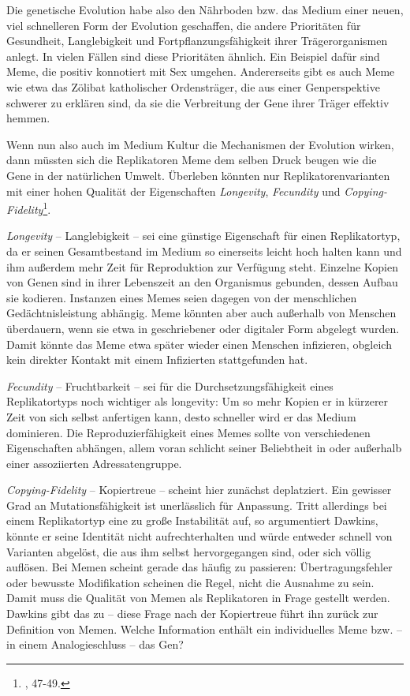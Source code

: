 \documentclass[openany,twoside,twocolumn]{book}
\let\rmarkdownfootnote\footnote%
\def\footnote{\protect\rmarkdownfootnote}
\begin{document}
Die genetische Evolution habe also den Nährboden bzw. das Medium einer neuen, viel schnelleren Form der Evolution geschaffen, die andere Prioritäten für Gesundheit, Langlebigkeit und Fortpflanzungsfähigkeit ihrer Trägerorganismen anlegt. In vielen Fällen sind diese Prioritäten ähnlich. Ein Beispiel dafür sind Meme, die positiv konnotiert mit Sex umgehen. Andererseits gibt es auch Meme wie etwa das Zölibat katholischer Ordensträger, die aus einer Genperspektive schwerer zu erklären sind, da sie die Verbreitung der Gene ihrer Träger effektiv hemmen.

Wenn nun also auch im Medium Kultur die Mechanismen der Evolution wirken, dann müssten sich die Replikatoren Meme dem selben Druck beugen wie die Gene in der natürlichen Umwelt. Überleben könnten nur Replikatorenvarianten mit einer hohen Qualität der Eigenschaften \emph{Longevity}, \emph{Fecundity} und \emph{Copying-Fidelity}\footnote{\textcite{Dawkinsselfishgene40th2016}, 47-49.}.

\emph{Longevity} -- Langlebigkeit -- sei eine günstige Eigenschaft für einen Replikatortyp, da er seinen Gesamtbestand im Medium so einerseits leicht hoch halten kann und ihm außerdem mehr Zeit für Reproduktion zur Verfügung steht. Einzelne Kopien von Genen sind in ihrer Lebenszeit an den Organismus gebunden, dessen Aufbau sie kodieren. Instanzen eines Memes seien dagegen von der menschlichen Gedächtnisleistung abhängig. Meme könnten aber auch außerhalb von Menschen überdauern, wenn sie etwa in geschriebener oder digitaler Form abgelegt wurden. Damit könnte das Meme etwa später wieder einen Menschen infizieren, obgleich kein direkter Kontakt mit einem Infizierten stattgefunden hat.

\emph{Fecundity} -- Fruchtbarkeit -- sei für die Durchsetzungsfähigkeit eines Replikatortyps noch wichtiger als longevity: Um so mehr Kopien er in kürzerer Zeit von sich selbst anfertigen kann, desto schneller wird er das Medium dominieren. Die Reproduzierfähigkeit eines Memes sollte von verschiedenen Eigenschaften abhängen, allem voran schlicht seiner Beliebtheit in oder außerhalb einer assoziierten Adressatengruppe.

\emph{Copying-Fidelity} -- Kopiertreue -- scheint hier zunächst deplatziert. Ein gewisser Grad an Mutationsfähigkeit ist unerlässlich für Anpassung. Tritt allerdings bei einem Replikatortyp eine zu große Instabilität auf, so argumentiert Dawkins, könnte er seine Identität nicht aufrechterhalten und würde entweder schnell von Varianten abgelöst, die aus ihm selbst hervorgegangen sind, oder sich völlig auflösen. Bei Memen scheint gerade das häufig zu passieren: Übertragungsfehler oder bewusste Modifikation scheinen die Regel, nicht die Ausnahme zu sein. Damit muss die Qualität von Memen als Replikatoren in Frage gestellt werden. Dawkins gibt das zu -- diese Frage nach der Kopiertreue führt ihn zurück zur Definition von Memen. Welche Information enthält ein individuelles Meme bzw. -- in einem Analogieschluss -- das Gen?
\end{document}
